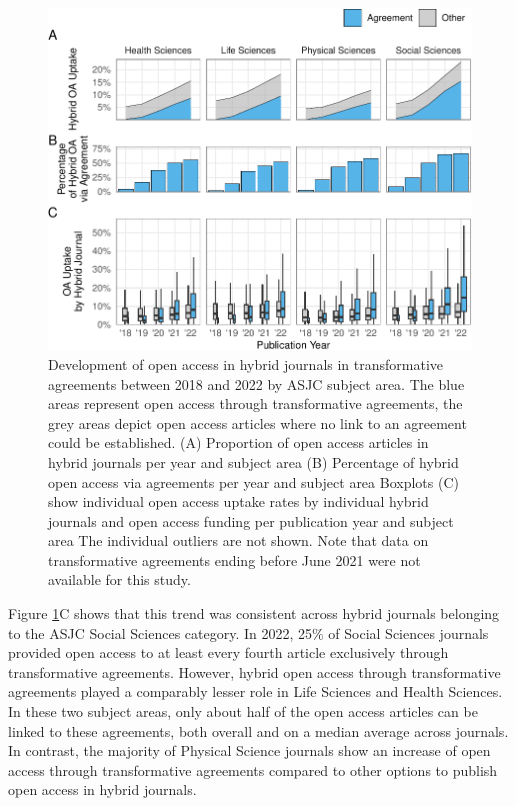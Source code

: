 \documentclass[a4paper,man,floatsintext,longtable,noextraspace,12pt]{apa6}
\begin{document}
\begin{figure}[ht!]

{\centering \includegraphics[width=0.99\linewidth,]{fig/subject_panel-1} 

}

\caption{Development of open access in hybrid journals in transformative agreements between 2018 and 2022 by ASJC subject area. The blue areas represent open access through transformative agreements, the grey areas depict open access articles where no link to an agreement could be established. (A) Proportion of open access articles in hybrid journals per year and subject area (B) Percentage of hybrid open access via agreements per year and subject area Boxplots (C) show individual open access uptake rates by individual hybrid journals and open access funding per publication year and subject area The individual outliers are not shown. Note that data on transformative agreements ending before June 2021 were not available for this study.}\label{fig:subject_panel}
\end{figure}

Figure \ref{fig:subject_panel}C shows that this trend was consistent
across hybrid journals belonging to the ASJC Social Sciences category.
In 2022, 25\% of Social Sciences journals provided open access to at
least every fourth article exclusively through transformative
agreements. However, hybrid open access through transformative
agreements played a comparably lesser role in Life Sciences and Health
Sciences. In these two subject areas, only about half of the open access
articles can be linked to these agreements, both overall and on a median
average across journals. In contrast, the majority of Physical Science
journals show an increase of open access through transformative
agreements compared to other options to publish open access in hybrid
journals.
\end{document}
